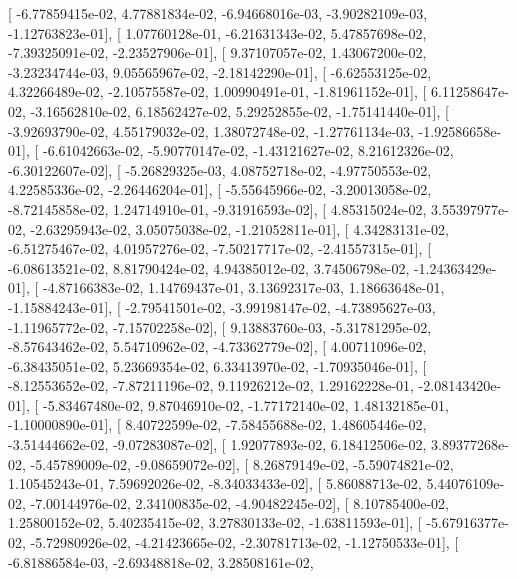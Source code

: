 \documentclass{article}
\begin{document}
       [ -6.77859415e-02,   4.77881834e-02,  -6.94668016e-03,
         -3.90282109e-03,  -1.12763823e-01],
       [  1.07760128e-01,  -6.21631343e-02,   5.47857698e-02,
         -7.39325091e-02,  -2.23527906e-01],
       [  9.37107057e-02,   1.43067200e-02,  -3.23234744e-03,
          9.05565967e-02,  -2.18142290e-01],
       [ -6.62553125e-02,   4.32266489e-02,  -2.10575587e-02,
          1.00990491e-01,  -1.81961152e-01],
       [  6.11258647e-02,  -3.16562810e-02,   6.18562427e-02,
          5.29252855e-02,  -1.75141440e-01],
       [ -3.92693790e-02,   4.55179032e-02,   1.38072748e-02,
         -1.27761134e-03,  -1.92586658e-01],
       [ -6.61042663e-02,  -5.90770147e-02,  -1.43121627e-02,
          8.21612326e-02,  -6.30122607e-02],
       [ -5.26829325e-03,   4.08752718e-02,  -4.97750553e-02,
          4.22585336e-02,  -2.26446204e-01],
       [ -5.55645966e-02,  -3.20013058e-02,  -8.72145858e-02,
          1.24714910e-01,  -9.31916593e-02],
       [  4.85315024e-02,   3.55397977e-02,  -2.63295943e-02,
          3.05075038e-02,  -1.21052811e-01],
       [  4.34283131e-02,  -6.51275467e-02,   4.01957276e-02,
         -7.50217717e-02,  -2.41557315e-01],
       [ -6.08613521e-02,   8.81790424e-02,   4.94385012e-02,
          3.74506798e-02,  -1.24363429e-01],
       [ -4.87166383e-02,   1.14769437e-01,   3.13692317e-03,
          1.18663648e-01,  -1.15884243e-01],
       [ -2.79541501e-02,  -3.99198147e-02,  -4.73895627e-03,
         -1.11965772e-02,  -7.15702258e-02],
       [  9.13883760e-03,  -5.31781295e-02,  -8.57643462e-02,
          5.54710962e-02,  -4.73362779e-02],
       [  4.00711096e-02,  -6.38435051e-02,   5.23669354e-02,
          6.33413970e-02,  -1.70935046e-01],
       [ -8.12553652e-02,  -7.87211196e-02,   9.11926212e-02,
          1.29162228e-01,  -2.08143420e-01],
       [ -5.83467480e-02,   9.87046910e-02,  -1.77172140e-02,
          1.48132185e-01,  -1.10000890e-01],
       [  8.40722599e-02,  -7.58455688e-02,   1.48605446e-02,
         -3.51444662e-02,  -9.07283087e-02],
       [  1.92077893e-02,   6.18412506e-02,   3.89377268e-02,
         -5.45789009e-02,  -9.08659072e-02],
       [  8.26879149e-02,  -5.59074821e-02,   1.10545243e-01,
          7.59692026e-02,  -8.34033433e-02],
       [  5.86088713e-02,   5.44076109e-02,  -7.00144976e-02,
          2.34100835e-02,  -4.90482245e-02],
       [  8.10785400e-02,   1.25800152e-02,   5.40235415e-02,
          3.27830133e-02,  -1.63811593e-01],
       [ -5.67916377e-02,  -5.72980926e-02,  -4.21423665e-02,
         -2.30781713e-02,  -1.12750533e-01],
       [ -6.81886584e-03,  -2.69348818e-02,   3.28508161e-02,
\end{document}

